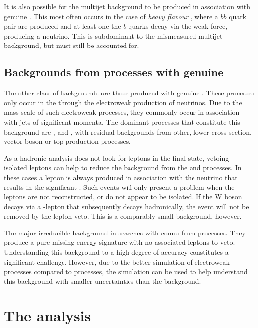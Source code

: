 It is also possible for the \QCD multijet background to be produced in
association with genuine \MET. This most often occurs in the case of
\emph{heavy flavour} \QCD, where a $b\bar{b}$ quark pair are produced
and at least one the $b$-quarks decay via the weak force, producing a
neutrino.  This is subdominant to the mismeasured multijet background,
but must still be accounted for. 


\subsection{Backgrounds from \SM processes with genuine
\MET}

The other class of \SM backgrounds are those produced with genuine
\MET. These processes only occur in the \SM through the electroweak
production of neutrinos. Due to the
mass scale of such electroweak processes, they commonly occur in
association with jets of significant momenta. The dominant
processes that constitute this background are \wj, \zj and \ttbar,
with residual backgrounds from other, lower cross section,
vector-boson or top production processes.

As a hadronic analysis does not look for leptons in the final state,
vetoing isolated leptons can help to reduce the background from the
\wj and \ttbar processes. In these cases a lepton is always produced
in association with the neutrino that results in the significant \MET.
Such events will only present a problem when the leptons are not
reconstructed, or do not appear to be isolated.  If the W boson
decays via a \tau-lepton that subsequently decays hadronically, the
event will not be removed by the lepton veto.  This is a comparably
small background, however.

The major irreducible background in \BSM searches with \MET comes from 
\znunu processes. They produce a pure missing energy signature with no
associated leptons to veto. Understanding this background to a high
degree of accuracy constitutes a significant challenge. However, due
to the better simulation of electroweak processes compared to \QCD
processes, the simulation can be used to help understand this
background with smaller uncertainties than the \QCD background.

\section{The \alphat analysis} 

